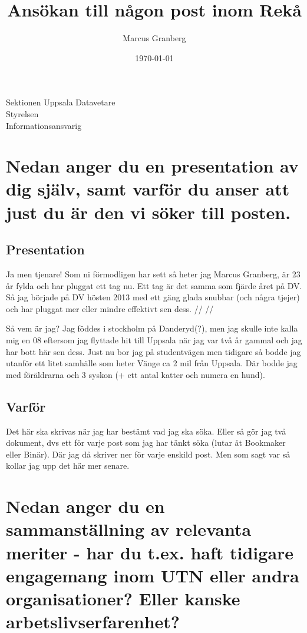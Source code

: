 \documentclass[a4paper]{article}
\title{Ansökan till någon post inom Rekå}
\author{Marcus Granberg}
\date{\today}
\begin{document}
\maketitle

\begin{center}
Sektionen Uppsala Datavetare \\ Styrelsen \\ 
Informationsansvarig
\end{center}

\newpage

\section{Nedan anger du en presentation av dig själv, 
samt varför du anser att just du är den vi söker till 
posten.}

\subsection{Presentation}

Ja men tjenare! Som ni förmodligen har sett så heter 
jag Marcus Granberg, är 23 år fylda och har pluggat 
ett tag nu. Ett tag är det samma som fjärde året på 
DV. Så jag började på DV hösten 2013 med ett gäng 
glada snubbar (och några tjejer) och har pluggat mer 
eller mindre effektivt sen dess. // // 

Så vem är jag? Jag föddes i stockholm på Danderyd(?), 
men jag skulle inte kalla mig en 08 eftersom jag 
flyttade hit till Uppsala när jag var två år gammal 
och jag har bott här sen dess. Just nu bor jag på 
studentvägen men tidigare så bodde jag utanför ett 
litet samhälle som heter Vänge ca 2 mil från Uppsala. 
Där bodde jag med föräldrarna och 3 syskon (+ ett 
antal katter och numera en hund). 

\subsection{Varför}

Det här ska skrivas när jag har bestämt vad jag ska 
söka. Eller så gör jag två dokument, dvs ett för varje 
post som jag har tänkt söka (lutar åt Bookmaker eller 
Binär). Där jag då skriver ner för varje enskild post. 
Men som sagt var så kollar jag upp det här mer senare.

\section{Nedan anger du en sammanställning av 
relevanta meriter - har du t.ex. haft tidigare 
engagemang inom UTN eller andra organisationer? Eller 
kanske arbetslivserfarenhet?}
\end{document}
